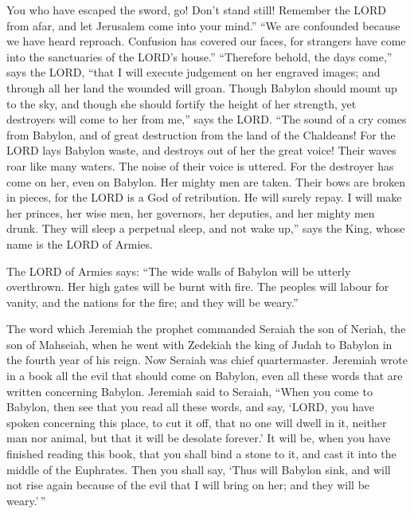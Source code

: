  You who have escaped the sword, go! Don't stand still!
Remember the LORD from afar, and let Jerusalem come into your mind.''
 ``We are confounded because we have heard reproach.
Confusion has covered our faces, for strangers have come into the
sanctuaries of the LORD's house.''  ``Therefore behold, the
days come,'' says the LORD, ``that I will execute judgement on her
engraved images; and through all her land the wounded will groan.
 Though Babylon should mount up to the sky, and though she
should fortify the height of her strength, yet destroyers will come to
her from me,'' says the LORD.  ``The sound of a cry comes
from Babylon, and of great destruction from the land of the Chaldeans!
 For the LORD lays Babylon waste, and destroys out of her
the great voice! Their waves roar like many waters. The noise of their
voice is uttered.  For the destroyer has come on her, even
on Babylon. Her mighty men are taken. Their bows are broken in pieces,
for the LORD is a God of retribution. He will surely repay.
 I will make her princes, her wise men, her governors, her
deputies, and her mighty men drunk. They will sleep a perpetual sleep,
and not wake up,'' says the King, whose name is the LORD of Armies.

 The LORD of Armies says: ``The wide walls of Babylon will
be utterly overthrown. Her high gates will be burnt with fire. The
peoples will labour for vanity, and the nations for the fire; and they
will be weary.''

 The word which Jeremiah the prophet commanded Seraiah the
son of Neriah, the son of Mahseiah, when he went with Zedekiah the king
of Judah to Babylon in the fourth year of his reign. Now Seraiah was
chief quartermaster.  Jeremiah wrote in a book all the evil
that should come on Babylon, even all these words that are written
concerning Babylon.  Jeremiah said to Seraiah, ``When you
come to Babylon, then see that you read all these words, 
and say, `LORD, you have spoken concerning this place, to cut it off,
that no one will dwell in it, neither man nor animal, but that it will
be desolate forever.'  It will be, when you have finished
reading this book, that you shall bind a stone to it, and cast it into
the middle of the Euphrates.  Then you shall say, `Thus
will Babylon sink, and will not rise again because of the evil that I
will bring on her; and they will be weary.'\,''

